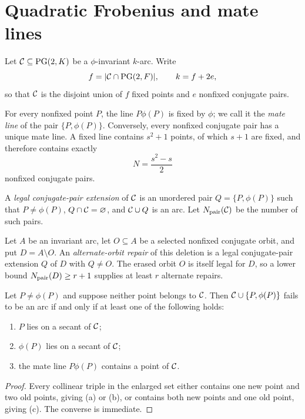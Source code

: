 \section{Quadratic Frobenius and mate lines}

Let $\mathcal{C}\subseteq\operatorname{PG}(2,K)$ be a $\phi$-invariant $k$-arc.  Write
\[
  f=|\mathcal{C}\cap\operatorname{PG}(2,F)|,
  \qquad k=f+2e,
\]
so that $\mathcal{C}$ is the disjoint union of $f$ fixed points and $e$ nonfixed
conjugate pairs.

For every nonfixed point $P$, the line $P\phi(P)$ is fixed by $\phi$; we
call it the \emph{mate line} of the pair $\{P,\phi(P)\}$.  Conversely, every
nonfixed conjugate pair has a unique mate line.  A fixed line contains
$s^2+1$ points, of which $s+1$ are fixed, and therefore contains exactly
\[
  N=\frac{s^2-s}{2}
\]
nonfixed conjugate pairs.

\begin{definition}\label{def:legal-pair}
A \emph{legal conjugate-pair extension} of $\mathcal{C}$ is an unordered pair
$Q=\{P,\phi(P)\}$ such that $P\ne\phi(P)$, $Q\cap\mathcal{C}=\varnothing$, and
$\mathcal{C}\cup Q$ is an arc.  Let $N_{\mathrm{pair}}(\mathcal{C})$ be the number of such pairs.
\end{definition}

\begin{definition}\label{def:alternate-repair}
Let $A$ be an invariant arc, let $O\subseteq A$ be a selected nonfixed
conjugate orbit, and put $D=A\setminus O$.  An \emph{alternate-orbit repair}
of this deletion is a legal conjugate-pair extension $Q$ of $D$ with
$Q\ne O$.  The erased orbit $O$ is itself legal for $D$, so a lower bound
$N_{\mathrm{pair}}(D)\ge r+1$ supplies at least $r$ alternate repairs.
\end{definition}

\begin{lemma}\label{lem:pair-test}
Let $P\ne\phi(P)$ and suppose neither point belongs to $\mathcal{C}$.  Then
$\mathcal{C}\cup\{P,\phi(P)\}$ fails to be an arc if and only if at least one of the
following holds:
\begin{enumerate}[label=(\alph*),leftmargin=2em]
\item $P$ lies on a secant of $\mathcal{C}$;
\item $\phi(P)$ lies on a secant of $\mathcal{C}$;
\item the mate line $P\phi(P)$ contains a point of $\mathcal{C}$.
\end{enumerate}
\end{lemma}

\begin{proof}
Every collinear triple in the enlarged set either contains one new point
and two old points, giving (a) or (b), or contains both new points and one
old point, giving (c).  The converse is immediate.
\end{proof}

